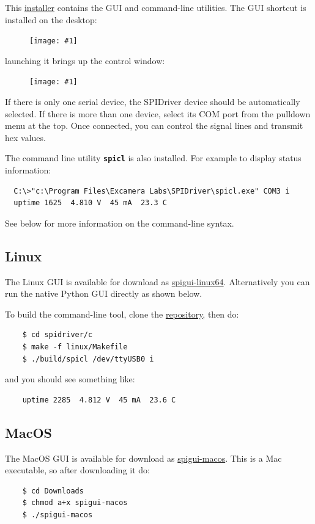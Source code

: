 \documentclass{article}
\newcommand{\png}[1]{
\begin{figure}[H]
\begin{center}
\texttt{[image: \#1]}
\end{center}
\end{figure}
}
\newcommand{\mach}[1]{\texttt{\textbf{#1}}}
\begin{document}
This
\href{https://spidriver.com/windows}{installer}
contains the GUI and command-line utilities.
The GUI shortcut is installed on the desktop:

\png{img/spidriver/icon}

launching it brings up the control window:

\png{img/spidriver/gui}

If there is only one serial device, 
the SPIDriver device should be automatically selected.
If there is more than one device, select its COM port from the pulldown menu at the top.
Once connected, you can control the signal lines and transmit hex values.

\index{spicl@\mach{spicl}}
The command line utility \mach{spicl} is also installed. For example to display status information:

\begin{lstlisting}
  C:\>"c:\Program Files\Excamera Labs\SPIDriver\spicl.exe" COM3 i
  uptime 1625  4.810 V  45 mA  23.3 C
\end{lstlisting}

See below for more information on the command-line syntax.

\subsection{Linux}

The Linux GUI is available for download as
\href{https://spidriver.com/linux}{spigui-linux64}.
Alternatively you can run the native Python GUI directly as shown below.

\index{spicl@\mach{spicl}}
To build the command-line tool, clone the
\href{https://github.com/jamesbowman/spidriver}{repository}, then do:
\begin{lstlisting}
    $ cd spidriver/c
    $ make -f linux/Makefile
    $ ./build/spicl /dev/ttyUSB0 i
\end{lstlisting}
and you should see something like:

\begin{lstlisting}
    uptime 2285  4.812 V  45 mA  23.6 C
\end{lstlisting}

\subsection{MacOS}

The MacOS GUI is available for download as
\href{https://spidriver.com/mac}{spigui-macos}.
This is a Mac executable, so after downloading it do:
\begin{lstlisting}
    $ cd Downloads
    $ chmod a+x spigui-macos
    $ ./spigui-macos
\end{lstlisting}
\end{document}
